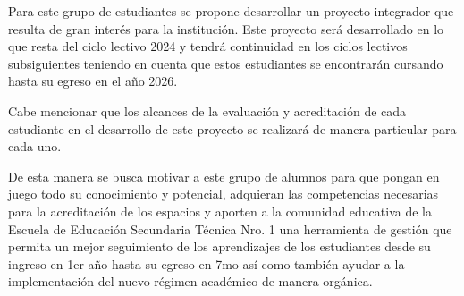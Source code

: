 Para este grupo de estudiantes se propone desarrollar un proyecto integrador que resulta de gran interés para la institución. Este proyecto será desarrollado en lo que resta del ciclo lectivo 2024 y tendrá continuidad en los ciclos lectivos subsiguientes teniendo en cuenta que estos estudiantes se encontrarán cursando hasta su egreso en el año 2026.

Cabe mencionar que los alcances de la evaluación y acreditación de cada estudiante en el desarrollo de este proyecto se realizará de manera particular para cada uno. 

De esta manera se busca motivar a este grupo de alumnos para que pongan en juego todo su conocimiento y potencial, adquieran las competencias necesarias para la acreditación de los espacios y aporten a la comunidad educativa de la Escuela de Educación Secundaria Técnica Nro. 1 una herramienta de gestión que permita un mejor seguimiento de los aprendizajes de los estudiantes desde su ingreso en 1er año hasta su egreso en 7mo así como también ayudar a la implementación del nuevo régimen académico de manera orgánica.
